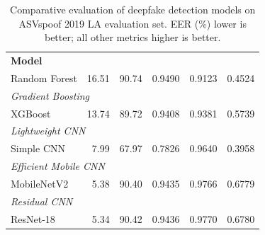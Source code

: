 \begin{table}[ht]
  \centering
  \caption{Comparative evaluation of deepfake detection models on ASVspoof 2019 LA evaluation set. EER (\%) lower is better; all other metrics higher is better.}
  \label{tab:performance}
  \begin{tabular}{lrrrrr}
    \toprule
    \textbf{Model} & \textbf{EER (%
    \midrule
    \multicolumn{6}{l}{\textit{Classical Ensemble}} \\
    Random Forest & 16.51 & 90.74 & 0.9490 & 0.9123 & 0.4524 \\
    \midrule
    \multicolumn{6}{l}{\textit{Gradient Boosting}} \\
    XGBoost & 13.74 & 89.72 & 0.9408 & 0.9381 & 0.5739 \\
    \midrule
    \multicolumn{6}{l}{\textit{Lightweight CNN}} \\
    Simple CNN & 7.99 & 67.97 & 0.7826 & 0.9640 & 0.3958 \\
    \midrule
    \multicolumn{6}{l}{\textit{Efficient Mobile CNN}} \\
    MobileNetV2 & 5.38 & 90.40 & 0.9435 & 0.9766 & 0.6779 \\
    \midrule
    \multicolumn{6}{l}{\textit{Residual CNN}} \\
    ResNet-18 & 5.34 & 90.42 & 0.9436 & 0.9770 & 0.6780 \\
    \bottomrule
  \end{tabular}
\end{table}
